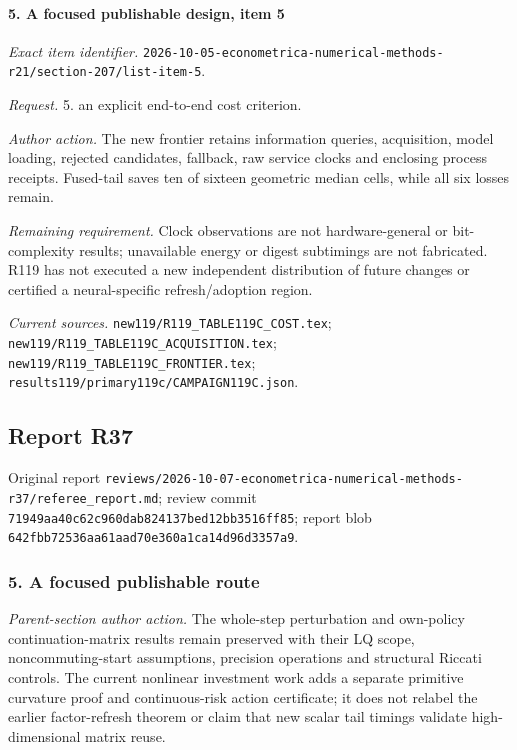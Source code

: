 \paragraph{5. A focused publishable design, item 5}

\emph{Exact item identifier.} \nolinkurl{2026-10-05-econometrica-numerical-methods-r21/section-207/list-item-5}.

\par\emph{Request.} 5. an explicit end-to-end cost criterion.

\par\emph{Author action.} The new frontier retains information queries, acquisition, model loading, rejected candidates, fallback, raw service clocks and enclosing process receipts. Fused-tail saves ten of sixteen geometric median cells, while all six losses remain.

\par\emph{Remaining requirement.} Clock observations are not hardware-general or bit-complexity results; unavailable energy or digest subtimings are not fabricated. R119 has not executed a new independent distribution of future changes or certified a neural-specific refresh/\allowbreak{}adoption region.

\par\emph{Current sources.} \nolinkurl{new119/R119_TABLE119C_COST.tex}; \nolinkurl{new119/R119_TABLE119C_ACQUISITION.tex}; \nolinkurl{new119/R119_TABLE119C_FRONTIER.tex}; \nolinkurl{results119/primary119c/CAMPAIGN119C.json}.

\subsection{Report R37}

Original report \nolinkurl{reviews/2026-10-07-econometrica-numerical-methods-r37/referee_report.md}; review commit \nolinkurl{71949aa40c62c960dab824137bed12bb3516ff85}; report blob \nolinkurl{642fbb72536aa61aad70e360a1ca14d96d3357a9}.

\subsubsection{5. A focused publishable route}

\emph{Parent-section author action.} The whole-step perturbation and own-policy continuation-matrix results remain preserved with their LQ scope, noncommuting-start assumptions, precision operations and structural Riccati controls. The current nonlinear investment work adds a separate primitive curvature proof and continuous-risk action certificate; it does not relabel the earlier factor-refresh theorem or claim that new scalar tail timings validate high-dimensional matrix reuse.

